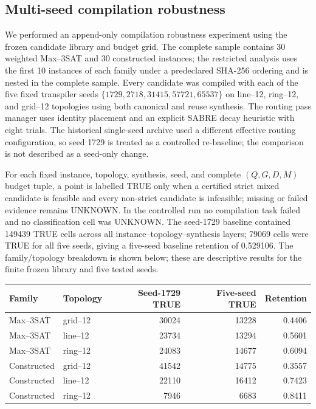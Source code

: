 \subsection{Multi-seed compilation robustness}
\label{sec:multiseed-robustness}
We performed an append-only compilation robustness experiment using the frozen
candidate library and budget grid.  The complete sample contains 30 weighted
Max--3SAT and 30 constructed instances; the restricted analysis uses the first
10 instances of each family under a predeclared SHA-256 ordering and is nested
in the complete sample.  Every candidate was compiled with each of the five
fixed transpiler seeds $\{1729,2718,31415,57721,65537\}$ on line--12, ring--12,
and grid--12 topologies using both canonical and reuse synthesis.  The routing
pass manager uses identity placement and an explicit SABRE decay heuristic with
eight trials.  The historical single-seed archive used a different effective
routing configuration, so seed 1729 is treated as a controlled re-baseline;
the comparison is not described as a seed-only change.

For each fixed instance, topology, synthesis, seed, and complete $(Q,G,D,M)$
budget tuple, a point is labelled TRUE only when a certified strict mixed
candidate is feasible and every non-strict candidate is infeasible; missing
or failed evidence remains UNKNOWN.  In the controlled run no compilation
task failed and no classification cell was UNKNOWN.  The seed-1729 baseline
contained 149439 TRUE cells across all instance--topology--synthesis layers;
79069 cells were TRUE for all five seeds, giving a five-seed baseline retention of 0.529106.
The family/topology breakdown is shown below; these are descriptive results
for the finite frozen library and five tested seeds.

\begin{center}
\begin{tabular}{llrrr}
\toprule
Family & Topology & Seed-1729 TRUE & Five-seed TRUE & Retention\\
\midrule
Max--3SAT & grid--12 & 30024 & 13228 & 0.4406\\
Max--3SAT & line--12 & 23734 & 13294 & 0.5601\\
Max--3SAT & ring--12 & 24083 & 14677 & 0.6094\\
Constructed & grid--12 & 41542 & 14775 & 0.3557\\
Constructed & line--12 & 22110 & 16412 & 0.7423\\
Constructed & ring--12 & 7946 & 6683 & 0.8411\\
\bottomrule
\end{tabular}
\end{center}


